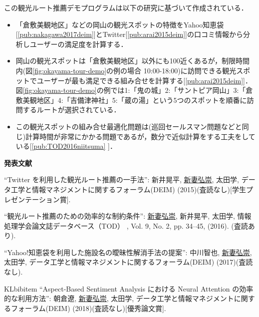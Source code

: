 \documentclass[11pt,a4j,dvipdfmx]{jarticle} 					%
\newcommand{\研究課題名}{人工知能のためのLispシステム}
\newcommand{\研究機関名}{大阪公立大学工業高等専門学校}
\newcommand{\研究代表者氏名}{新妻弘崇}
\newcommand{\mejp}{\underline{\underline{新妻弘崇}}}
\newcommand{\ohtajp}{太田学}
\newcommand{\研究期間の最終元号年度}{11}  %
\begin{document}
この観光ルート推薦デモプログラムは以下の研究に基づいて作成されている．
\begin{itemize}
\item 「倉敷美観地区」などの岡山の観光スポットの特徴をYahoo知恵袋[\ref{pub:nakagawa2017deim}]とTwitter[\ref{pub:arai2015deim}]の口コミ情報から分析しユーザーの満足度を計算する．
\item 岡山の観光スポットは「倉敷美観地区」以外にも100近くあるが，制限時間内(図\ref{fig:okayama-tour-demo}の例の場合 10:00-18:00)に訪問できる観光スポットでユーザーが最も満足できる組み合せを計算する[\ref{pub:arai2015deim}]．
  図\ref{fig:okayama-tour-demo}の例では1:「鬼の城」2:「サントピア岡山」3:「倉敷美観地区」4:「吉備津神社」5:「蔵の湯」という5つのスポットを順番に訪問するルートが選択されている．
\item この観光スポットの組み合せ最適化問題は(巡回セールスマン問題などと同じ)計算時間が非常にかかる問題であるが，数分で近似計算をする工夫をしている[\ref{pub:TOD2016niitsuma}
  ]．
\end{itemize}

\noindent
\textbf{発表文献}

\KLbibitem
\label{pub:arai2015deim}
``Twitter を利用した観光ルート推薦の一手法'':
新井晃平, \mejp, \ohtajp,
データ工学と情報マネジメントに関するフォーラム(DEIM)  (2015)(査読なし)[学生プレゼンテーション賞].
     

\KLbibitem 
\label{pub:TOD2016niitsuma}
``観光ルート推薦のための効率的な制約条件'':  \mejp, 新井晃平, \ohtajp,     情報処理学会論文誌データベース（TOD） , Vol. 9, No. 2, pp. 34--45, (2016). (査読あり).

\KLbibitem
\label{pub:nakagawa2017deim}
``Yahoo!知恵袋を利用した施設名の曖昧性解消手法の提案'':     中川智也, \mejp, \ohtajp,     データ工学と情報マネジメントに関するフォーラム(DEIM) (2017)(査読なし).


KLbibitem
\label{pub:asakura2018deim}
``Aspect-Based Sentiment Analysis における Neural Attention の効率的な利用方法'':     朝倉遼, \mejp, \ohtajp,     データ工学と情報マネジメントに関するフォーラム(DEIM) (2018)(査読なし)[優秀論文賞].
\end{document}
